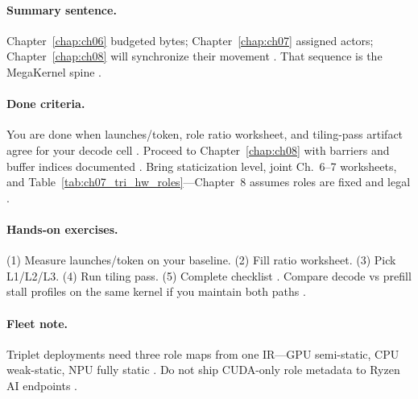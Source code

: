 \paragraph{Summary sentence.}
Chapter~\ref{chap:ch06} budgeted bytes; Chapter~\ref{chap:ch07} assigned actors; Chapter~\ref{chap:ch08} will synchronize their movement \citep{dao2022flashattention,semianalysis2024tma,yirage2026,shah2024flashattention3}.
That sequence is the MegaKernel spine \citep{mpk2025,wu2024mirage,memoryfloor2026,patel2025llminference,taxbreak2026,chen2020compilerbasedhardw}.

\paragraph{Done criteria.}
You are done when launches/token, role ratio worksheet, and tiling-pass artifact agree for your decode cell \citep{yirage2026,taxbreak2026,patel2025llminference}.
Proceed to Chapter~\ref{chap:ch08} with barriers and buffer indices documented \citep{semianalysis2024tma,dao2022flashattention}.
Bring staticization level, joint Ch.~6--7 worksheets, and Table~\ref{tab:ch07_tri_hw_roles}---Chapter~8 assumes roles are fixed and legal \citep{dao2022flashattention,yirage2026,shah2024flashattention3,mpk2025,chen2020compilerbasedhardw}.

\paragraph{Hands-on exercises.}
(1) Measure launches/token on your baseline. (2) Fill ratio worksheet. (3) Pick L1/L2/L3. (4) Run tiling pass. (5) Complete checklist \citep{taxbreak2026,shah2024flashattention3,yirage2026,patel2025llminference,mpk2025,amd2024xdna,nvidia2022hopper,semianalysis2024tma,dao2022flashattention,memoryfloor2026,wu2024mirage,nvidia2024cudagraphs,kwon2023vllm,dlbook,chen2020compilerbasedhardw,amd2024aie,rotem2018glow}.
Compare decode vs prefill stall profiles on the same kernel if you maintain both paths \citep{kwon2023vllm,shah2024flashattention3,taxbreak2026}.

\paragraph{Fleet note.}
Triplet deployments need three role maps from one IR---GPU semi-static, CPU weak-static, NPU fully static \citep{patel2025llminference,yirage2026,amd2024aie,nvidia2022hopper,chen2020compilerbasedhardw}.
Do not ship CUDA-only role metadata to Ryzen AI endpoints \citep{amd2024xdna,taxbreak2026,memoryfloor2026}.


